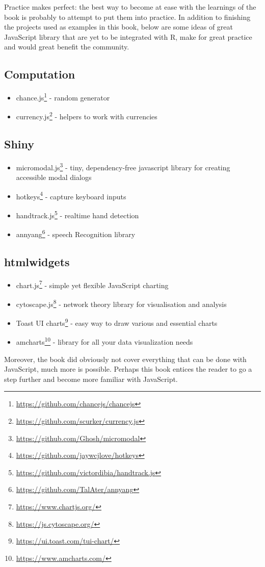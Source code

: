 \documentclass[
]{krantz}
\providecommand{\tightlist}{%
  \setlength{\itemsep}{0pt}\setlength{\parskip}{0pt}}
\renewcommand{\href}[2]{#2\footnote{\url{#1}}}
\begin{document}
Practice makes perfect: the best way to become at ease with the learnings of the book is probably to attempt to put them into practice. In addition to finishing the projects used as examples in this book, below are some ideas of great JavaScript library that are yet to be integrated with R, make for great practice and would great benefit the community.

\hypertarget{computation}{%
\subsection*{Computation}\label{computation}}


\begin{itemize}
\tightlist
\item
  \href{https://github.com/chancejs/chancejs}{chance.js} - random generator
\item
  \href{https://github.com/scurker/currency.js}{currency.js} - helpers to work with currencies
\end{itemize}

\hypertarget{shiny-1}{%
\subsection*{Shiny}\label{shiny-1}}


\begin{itemize}
\tightlist
\item
  \href{https://github.com/Ghosh/micromodal}{micromodal.js} - tiny, dependency-free javascript library for creating accessible modal dialogs
\item
  \href{https://github.com/jaywcjlove/hotkeys}{hotkeys} - capture keyboard inputs
\item
  \href{https://github.com/victordibia/handtrack.js}{handtrack.js} - realtime hand detection
\item
  \href{https://github.com/TalAter/annyang}{annyang} - speech Recognition library
\end{itemize}

\hypertarget{htmlwidgets-1}{%
\subsection*{htmlwidgets}\label{htmlwidgets-1}}


\begin{itemize}
\tightlist
\item
  \href{https://www.chartjs.org/}{chart.js} - simple yet flexible JavaScript charting
\item
  \href{https://js.cytoscape.org/}{cytoscape.js} - network theory library for visualisation and analysis
\item
  \href{https://ui.toast.com/tui-chart/}{Toast UI charts} - easy way to draw various and essential charts
\item
  \href{https://www.amcharts.com/}{amcharts} - library for all your data visualization needs
\end{itemize}

Moreover, the book did obviously not cover everything that can be done with JavaScript, much more is possible. Perhaps this book entices the reader to go a step further and become more familiar with JavaScript.

  

\backmatter
\printindex
\end{document}
